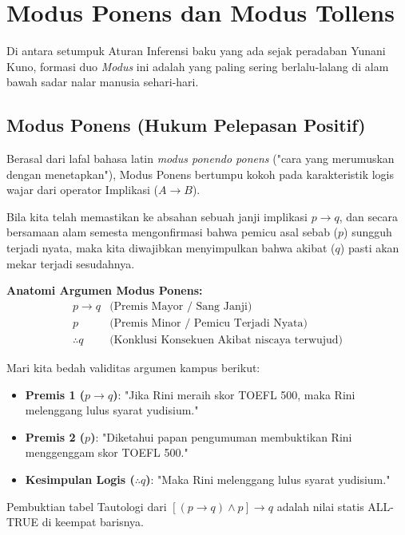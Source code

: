 \section{Modus Ponens dan Modus Tollens}

Di antara setumpuk Aturan Inferensi baku yang ada sejak peradaban Yunani Kuno, formasi duo \textit{Modus} ini adalah yang paling sering berlalu-lalang di alam bawah sadar nalar manusia sehari-hari.

\subsection{Modus Ponens (Hukum Pelepasan Positif)}

Berasal dari lafal bahasa latin \textit{modus ponendo ponens} ("cara yang merumuskan dengan menetapkan"), Modus Ponens bertumpu kokoh pada karakteristik logis wajar dari operator Implikasi ($A \rightarrow B$). 

\begin{teorema}
Bila kita telah memastikan ke absahan sebuah janji implikasi $p \rightarrow q$, dan secara bersamaan alam semesta mengonfirmasi bahwa pemicu asal sebab ($p$) sungguh terjadi nyata, maka kita diwajibkan menyimpulkan bahwa akibat ($q$) pasti akan mekar terjadi sesudahnya. 
\end{teorema}

\textbf{Anatomi Argumen Modus Ponens:}
\[
\begin{array}{cl}
p \rightarrow q & \text{(Premis Mayor / Sang Janji)} \\
p & \text{(Premis Minor / Pemicu Terjadi Nyata)} \\
\hline
\therefore q & \text{(Konklusi Konsekuen Akibat niscaya terwujud)}
\end{array}
\]

\begin{contoh}
Mari kita bedah validitas argumen kampus berikut:
\begin{itemize}
    \item \textbf{Premis 1 ($p \rightarrow q$)}: "Jika Rini meraih skor TOEFL 500, maka Rini melenggang lulus syarat yudisium."
    \item \textbf{Premis 2 ($p$)}: "Diketahui papan pengumuman membuktikan Rini menggenggam skor TOEFL 500."
    \item \textbf{Kesimpulan Logis ($\therefore q$)}: "Maka Rini melenggang lulus syarat yudisium."
\end{itemize}
\end{contoh}
Pembuktian tabel Tautologi dari $[(p \rightarrow q) \land p] \rightarrow q$ adalah nilai statis ALL-TRUE di keempat barisnya.

